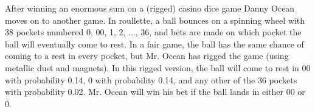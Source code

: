 \documentclass[addpoints]{examsetup}\usepackage[]{graphicx}\usepackage[]{color}
\newenvironment{knitrout}{}{} %
\begin{document}
\begin{questions}

\newpage

\question 


After winning an enormous sum on a (rigged) casino dice game Danny Ocean moves on to another game.
In roullette, a ball bounces on a spinning wheel with 38 pockets numbered 0, 00, 1, 2, ..., 36, and bets are made on which pocket the ball will eventually come to rest. 
In a fair game, the ball has the same chance of coming to a rest in every pocket, but Mr. Ocean has rigged the game (using metallic dust and magnets).
In this rigged version, the ball will come to rest in 00 with probability 0.14, 0 with probability 0.14, and any other of the 36 pockets with probability 0.02.
Mr. Ocean will win his bet if the ball lands in either 00 or 0. 


\end{questions}
\end{document}

